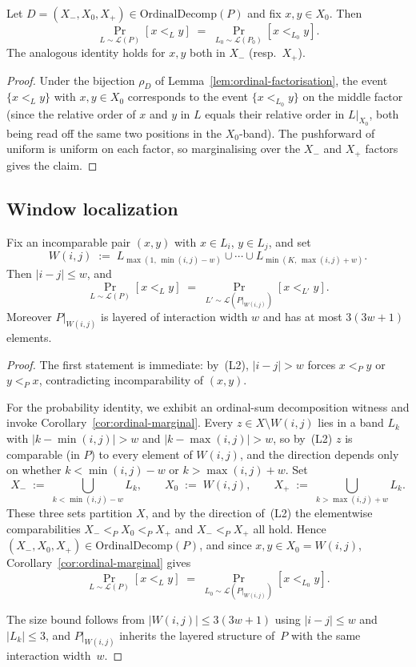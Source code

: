 \begin{corollary}
\label{cor:ordinal-marginal}
Let $D = (X_-, X_0, X_+) \in \mathrm{OrdinalDecomp}(P)$ and fix
$x, y \in X_0$. Then
\[
  \Pr_{L \sim \mathcal L(P)}[x <_L y] \;=\;
  \Pr_{L_0 \sim \mathcal L(P_0)}[x <_{L_0} y].
\]
The analogous identity holds for $x, y$ both in $X_-$ (resp.\ $X_+$).
\end{corollary}

\begin{proof}
Under the bijection $\rho_D$ of Lemma~\ref{lem:ordinal-factorisation},
the event $\{x <_L y\}$ with $x, y \in X_0$ corresponds to the event
$\{x <_{L_0} y\}$ on the middle factor (since the relative order of
$x$ and $y$ in $L$ equals their relative order in $L|_{X_0}$, both
being read off the same two positions in the $X_0$-band). The
pushforward of uniform is uniform on each factor, so marginalising
over the $X_-$ and $X_+$ factors gives the claim.
\end{proof}

\subsection{Window localization}
\label{subsec:window-localization}

\begin{lemma}\label{lem:window-localization}
Fix an incomparable pair $(x, y)$ with $x \in L_i$, $y \in L_j$, and
set
\[
  W(i,j) \;:=\; L_{\max(1,\,\min(i,j)-w)}
  \cup \cdots \cup L_{\min(K,\,\max(i,j)+w)}.
\]
Then $|i - j| \le w$, and
\[
  \Pr_{L \sim \mathcal L(P)}[x <_L y]
  \;=\;
  \Pr_{L' \sim \mathcal L(P|_{W(i,j)})}[x <_{L'} y].
\]
Moreover $P|_{W(i,j)}$ is layered of interaction width $w$ and has at
most $3(3w + 1)$ elements.
\end{lemma}

\begin{proof}
The first statement is immediate: by~(L2), $|i-j| > w$ forces $x <_P y$
or $y <_P x$, contradicting incomparability of $(x,y)$.

For the probability identity, we exhibit an ordinal-sum decomposition
witness and invoke Corollary~\ref{cor:ordinal-marginal}. Every $z \in
X \setminus W(i,j)$ lies in a band $L_k$ with $|k - \min(i,j)| > w$
and $|k - \max(i,j)| > w$, so by~(L2) $z$ is comparable (in $P$) to
every element of $W(i,j)$, and the direction depends only on whether
$k < \min(i,j) - w$ or $k > \max(i,j) + w$. Set
\[
  X_- \;:=\; \bigcup_{k < \min(i,j) - w} L_k,
  \qquad X_0 \;:=\; W(i,j),
  \qquad X_+ \;:=\; \bigcup_{k > \max(i,j) + w} L_k.
\]
These three sets partition $X$, and by the direction of~(L2) the
elementwise comparabilities $X_- <_P X_0 <_P X_+$ and $X_- <_P X_+$
all hold. Hence $(X_-, X_0, X_+) \in \mathrm{OrdinalDecomp}(P)$, and
since $x, y \in X_0 = W(i,j)$,
Corollary~\ref{cor:ordinal-marginal} gives
\[
  \Pr_{L \sim \mathcal L(P)}[x <_L y] \;=\;
  \Pr_{L_0 \sim \mathcal L(P|_{W(i,j)})}[x <_{L_0} y].
\]

The size bound follows from $|W(i,j)| \le 3(3w+1)$ using $|i-j| \le w$
and $|L_k| \le 3$, and $P|_{W(i,j)}$ inherits the layered structure
of~$P$ with the same interaction width~$w$.
\end{proof}


